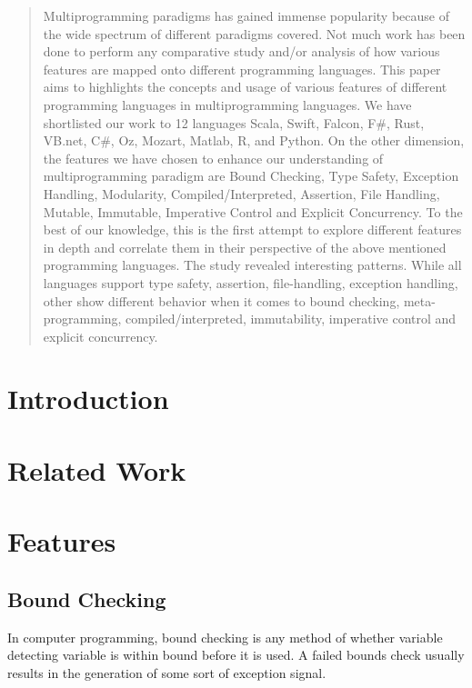 \documentclass{sig-alternate}
\begin{document}
\maketitle
\begin{abstract}
Multiprogramming paradigms has gained immense popularity because of the wide spectrum of different paradigms covered. Not much work has been done to perform any comparative study and/or analysis of how various features are mapped onto different programming languages. This paper aims to highlights the concepts and usage of various features of different programming languages in multiprogramming languages. We have shortlisted our work to 12 languages Scala, Swift, Falcon, F#, Rust, VB.net, C#, Oz, Mozart, Matlab, R, and Python. On the other dimension, the features we have chosen to enhance our understanding of multiprogramming paradigm are Bound Checking, Type Safety, Exception Handling, Modularity, Compiled/Interpreted, Assertion, File Handling, Mutable, Immutable, Imperative Control and Explicit Concurrency. To the best of our knowledge, this is the first attempt to explore different features in depth and correlate them in their perspective of the above mentioned programming languages. The study revealed interesting patterns. While all languages support type safety, assertion, file-handling, exception handling, other show different behavior when it comes to bound checking, meta-programming, compiled/interpreted, immutability, imperative control and explicit concurrency.
\end{abstract}




\section{Introduction}



\section{Related Work}

\section{Features}

\subsection{Bound Checking}
In computer programming, bound checking is any method of whether variable detecting variable is within bound before it is used.  A failed bounds check usually results in the generation of some sort of exception signal.
\end{document}
